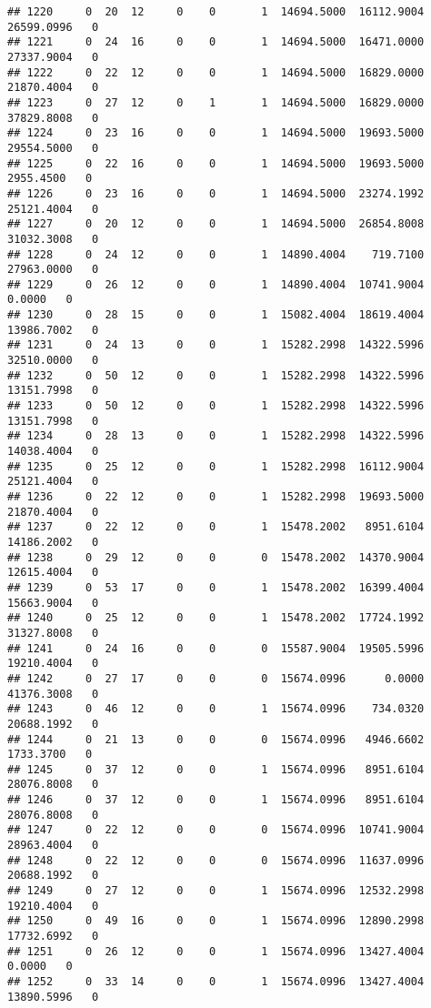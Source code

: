 \documentclass[
]{article}
\begin{document}
\begin{enumerate}
\begin{verbatim}
## 1220     0  20  12     0    0       1  14694.5000  16112.9004  26599.0996   0
## 1221     0  24  16     0    0       1  14694.5000  16471.0000  27337.9004   0
## 1222     0  22  12     0    0       1  14694.5000  16829.0000  21870.4004   0
## 1223     0  27  12     0    1       1  14694.5000  16829.0000  37829.8008   0
## 1224     0  23  16     0    0       1  14694.5000  19693.5000  29554.5000   0
## 1225     0  22  16     0    0       1  14694.5000  19693.5000   2955.4500   0
## 1226     0  23  16     0    0       1  14694.5000  23274.1992  25121.4004   0
## 1227     0  20  12     0    0       1  14694.5000  26854.8008  31032.3008   0
## 1228     0  24  12     0    0       1  14890.4004    719.7100  27963.0000   0
## 1229     0  26  12     0    0       1  14890.4004  10741.9004      0.0000   0
## 1230     0  28  15     0    0       1  15082.4004  18619.4004  13986.7002   0
## 1231     0  24  13     0    0       1  15282.2998  14322.5996  32510.0000   0
## 1232     0  50  12     0    0       1  15282.2998  14322.5996  13151.7998   0
## 1233     0  50  12     0    0       1  15282.2998  14322.5996  13151.7998   0
## 1234     0  28  13     0    0       1  15282.2998  14322.5996  14038.4004   0
## 1235     0  25  12     0    0       1  15282.2998  16112.9004  25121.4004   0
## 1236     0  22  12     0    0       1  15282.2998  19693.5000  21870.4004   0
## 1237     0  22  12     0    0       1  15478.2002   8951.6104  14186.2002   0
## 1238     0  29  12     0    0       0  15478.2002  14370.9004  12615.4004   0
## 1239     0  53  17     0    0       1  15478.2002  16399.4004  15663.9004   0
## 1240     0  25  12     0    0       1  15478.2002  17724.1992  31327.8008   0
## 1241     0  24  16     0    0       0  15587.9004  19505.5996  19210.4004   0
## 1242     0  27  17     0    0       0  15674.0996      0.0000  41376.3008   0
## 1243     0  46  12     0    0       1  15674.0996    734.0320  20688.1992   0
## 1244     0  21  13     0    0       0  15674.0996   4946.6602   1733.3700   0
## 1245     0  37  12     0    0       1  15674.0996   8951.6104  28076.8008   0
## 1246     0  37  12     0    0       1  15674.0996   8951.6104  28076.8008   0
## 1247     0  22  12     0    0       0  15674.0996  10741.9004  28963.4004   0
## 1248     0  22  12     0    0       0  15674.0996  11637.0996  20688.1992   0
## 1249     0  27  12     0    0       1  15674.0996  12532.2998  19210.4004   0
## 1250     0  49  16     0    0       1  15674.0996  12890.2998  17732.6992   0
## 1251     0  26  12     0    0       1  15674.0996  13427.4004      0.0000   0
## 1252     0  33  14     0    0       1  15674.0996  13427.4004  13890.5996   0

\end{verbatim}
\end{enumerate}
\end{document}
